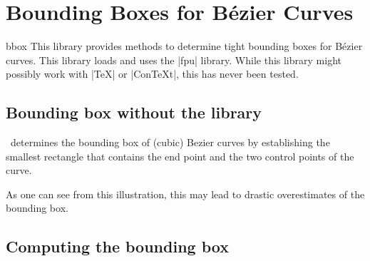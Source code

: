 %
%

\section{Bounding Boxes for B\'ezier Curves}


\begin{pgflibrary}{bbox}
    This library provides methods to determine tight bounding boxes for
    B\'ezier curves. This library loads and uses the
	|fpu| library. While this library might
	possibly work with |TeX| or |ConTeXt|, this has never been tested.
\end{pgflibrary}

\subsection{Bounding box without the library}

\tikzname\ determines the bounding box of (cubic) Bezier curves by establishing the
smallest rectangle that contains the end point and the two control points of the
curve.

\begin{codeexample}[width=5cm]
\end{codeexample}

As one can see from this illustration, this may lead to drastic overestimates of
the bounding box.

\subsection{Computing the bounding box}

